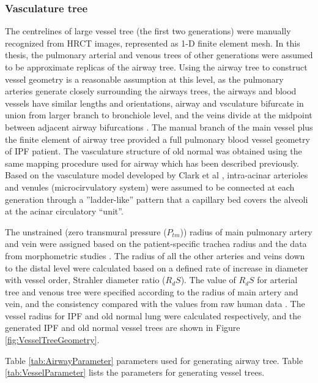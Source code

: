 \subsubsection{Vasculature tree}
The centrelines of large vessel tree (the first two generations) were manually recognized from HRCT images, represented as 1-D finite element mesh. In this thesis, the pulmonary arterial and venous trees of other generations were assumed to be approximate replicas of the airway tree. Using the airway tree to construct vessel geometry is a reasonable assumption at this level, as the pulmonary arteries generate closely surrounding the airways trees, the airways and blood vessels have similar lengths and orientations, airway and vsculature bifurcate in union from larger branch to bronchiole level, and the veins divide at the midpoint between adjacent airway bifurcations \citep{weibel1984pathway, hsia2016lung}. The manual branch of the main vessel plus the finite element of airway tree provided a full pulmonary blood vessel geometry of IPF patient. The vasculature structure of old normal was obtained using the same mapping procedure used for airway which has been described previously. Based on the vasculature model developed by Clark et al \citep{clark2010contribution,clark2011interdependent}, intra-acinar arterioles and venules (microcirvulatory system) were assumed to be connected at each generation through a ''ladder-like'' pattern that a capillary bed covers the alveoli at the acinar circulatory “unit”.

The unstrained (zero transmural pressure ($P_{tm}$)) radius of main pulmonary artery and vein were assigned based on the patient-specific trachea radius and the data from morphometric studies \citep{horsfield1978morphometry,horsfield1981morphometry,huang1996morphometry}. The radius of all the other arteries and veins down to the distal level were calculated based on a defined rate of increase in diameter with vessel order, Strahler diameter ratio ($R_dS$). The value of $R_dS$ for arterial tree and venous tree were specified according to the radius of main artery and vein, and the consistency compared with the values from raw human data \citep{horsfield1978morphometry,horsfield1981morphometry,huang1996morphometry}. The vessel radius for IPF and old normal lung were calculated respectively, and the generated IPF and old normal vessel trees are shown in Figure \ref{fig:VesselTreeGeometry}. 

Table \ref{tab:AirwayParameter} parameters used for generating airway tree. Table \ref{tab:VesselParameter} lists the parameters for generating vessel trees. 

